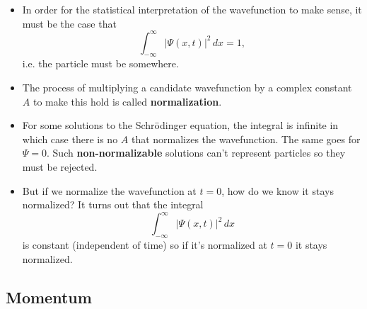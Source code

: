 \documentclass{article}
\begin{document}
\begin{itemize}
  \item In order for the statistical interpretation of the wavefunction to make sense, it must be the case that \[\int_{-\infty}^\infty |\Psi(x, t)|^2 \,d x = 1,\] i.e. the particle must be somewhere.

  \item The process of multiplying a candidate wavefunction by a complex constant $A$ to make this hold is called \textbf{normalization}.

  \item For some solutions to the Schrödinger equation, the integral is infinite in which case there is no $A$ that normalizes the wavefunction. The same goes for $\Psi = 0$. Such \textbf{non-normalizable} solutions can't represent particles so they must be rejected.

  \item But if we normalize the wavefunction at $t = 0$, how do we know it stays normalized? It turns out that the integral \[\int_{-\infty}^\infty |\Psi(x, t)|^2 \,d x\] is constant (independent of time) so if it's normalized at $t = 0$ it stays normalized.
\end{itemize}

\subsection{Momentum}
\end{document}
